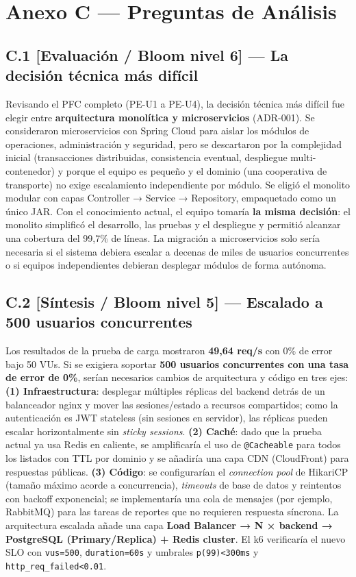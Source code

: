 \section*{Anexo C --- Preguntas de Análisis}
\subsection*{C.1 [Evaluación / Bloom nivel 6] --- La decisión técnica más difícil}

Revisando el PFC completo (PE-U1 a PE-U4), la decisión técnica más difícil fue elegir entre \textbf{arquitectura
monolítica y microservicios} (ADR-001). Se consideraron microservicios con Spring Cloud para aislar los módulos de
operaciones, administración y seguridad, pero se descartaron por la complejidad inicial (transacciones distribuidas,
consistencia eventual, despliegue multi-contenedor) y porque el equipo es pequeño y el dominio (una cooperativa de
transporte) no exige escalamiento independiente por módulo. Se eligió el monolito modular con capas Controller →
Service → Repository, empaquetado como un único JAR. Con el conocimiento actual, el equipo tomaría \textbf{la misma
decisión}: el monolito simplificó el desarrollo, las pruebas y el despliegue y permitió alcanzar una cobertura del
99,7\% de líneas. La migración a microservicios solo sería necesaria si el sistema debiera escalar a decenas de
miles de usuarios concurrentes o si equipos independientes debieran desplegar módulos de forma autónoma.

\subsection*{C.2 [Síntesis / Bloom nivel 5] --- Escalado a 500 usuarios concurrentes}

Los resultados de la prueba de carga mostraron \textbf{49,64 req/s} con 0\% de error bajo 50 VUs. Si se exigiera
soportar \textbf{500 usuarios concurrentes con una tasa de error de 0\%}, serían necesarios cambios de arquitectura
y código en tres ejes: \textbf{(1) Infraestructura}: desplegar múltiples réplicas del backend detrás de un balanceador
nginx y mover las sesiones/estado a recursos compartidos; como la autenticación es JWT stateless (sin sesiones en
servidor), las réplicas pueden escalar horizontalmente sin \textit{sticky sessions}. \textbf{(2) Caché}: dado que la
prueba actual ya usa Redis en caliente, se amplificaría el uso de \texttt{@Cacheable} para todos los listados con
TTL por dominio y se añadiría una capa CDN (CloudFront) para respuestas públicas. \textbf{(3) Código}: se
configurarían el \textit{connection pool} de HikariCP (tamaño máximo acorde a concurrencia), \textit{timeouts} de
base de datos y reintentos con backoff exponencial; se implementaría una cola de mensajes (por ejemplo, RabbitMQ)
para las tareas de reportes que no requieren respuesta síncrona. La arquitectura escalada añade una capa
\textbf{Load Balancer → N × backend → PostgreSQL (Primary/Replica) + Redis cluster}. El k6 verificaría el nuevo SLO
con \texttt{vus=500}, \texttt{duration=60s} y umbrales \texttt{p(99)<300ms} y \texttt{http\_req\_failed<0.01}.

